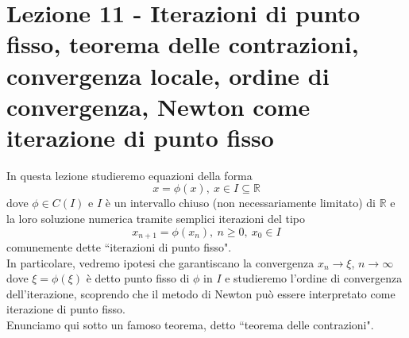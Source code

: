 \section[Lezione 11 - Iterazioni di punto fisso]{Lezione 11 - Iterazioni di punto fisso, teorema delle contrazioni, convergenza locale, ordine di convergenza, Newton come iterazione di punto fisso}

In questa lezione studieremo equazioni della forma 
\[ x=\phi(x), \ x \in I \subseteq \mathbb{R} \]
dove $\phi \in C(I)$ e $I$ è un intervallo chiuso (non necessariamente limitato) di $\mathbb{R}$ e la loro soluzione numerica tramite semplici iterazioni del tipo
\[ x_{n+1} = \phi(x_n), \ n \geq 0, \ x_0 \in I \]
comunemente dette ``iterazioni di punto fisso".\\
In particolare, vedremo ipotesi che garantiscano la convergenza $x_n \rightarrow \xi$, $n \rightarrow \infty$ dove $\xi = \phi(\xi)$ è detto punto fisso di $\phi$ in $I$ e studieremo l'ordine di convergenza dell'iterazione, scoprendo che il metodo di Newton  può essere interpretato come iterazione di punto fisso. \\
Enunciamo qui sotto un famoso teorema, detto ``teorema delle contrazioni".

